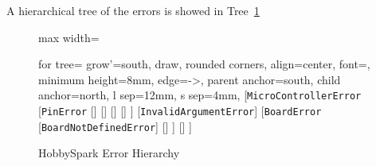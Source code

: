 	A hierarchical tree of the errors is showed in Tree~\ref{tree:error-hierarchy}
	\begin{figure}[H]
		\centering
		
		\begin{adjustbox}{max width=\textwidth}
			\begin{forest}
				for tree={
					grow'=south,
					draw,
					rounded corners,
					align=center,
					font=\small,
					minimum height=8mm,
					edge={->},
					parent anchor=south,
					child anchor=north,
					l sep=12mm,
					s sep=4mm,
				}
				[\texttt{MicroControllerError}
				[\texttt{PinError}
				[]
				[]
				[]
				[]
				]
				[\texttt{InvalidArgumentError}]
				[\texttt{BoardError}
				[\texttt{BoardNotDefinedError}]
				[]
				]
				[]
				]
			\end{forest}
		\end{adjustbox}
		
		\caption{HobbySpark Error Hierarchy}
		\label{tree:error-hierarchy}
		
	\end{figure}
	
